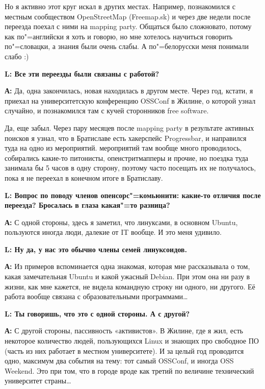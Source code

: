 \documentclass[10pt, a5paper]{article}
\begin{document}
Но я активно этот круг искал в других местах. Например, познакомился с местным сообществом OpenStreetMap (Freemap.sk) и через две недели после переезда поехал с ними на mapping party. Общаться было сложновато, потому как по"=английски я хоть и говорю, но мне хотелось научиться говорить по"=словацки, а знания были очень слабы. А по"=белорусски меня понимали слабо :)

{\noindent \bf L: Все эти переезды были связаны с работой?}

{\noindent \bf А:} Да, одна закончилась, новая находилась в другом месте. Через год, кстати, я приехал на университетскую конференцию OSSConf в Жилине, о которой узнал случайно, и познакомился там с кучей сторонников free software.

Да, еще забыл. Через пару месяцев после mapping party в результате активных поисков я узнал, что в Братиславе есть хакерспейс Progressbar, и направился туда на одно из мероприятий. мероприятий там вообще много проводилось, собирались какие-то питонисты, опенстритмапперы и прочие, но поездка туда занимала бы 5 часов в одну сторону, поэтому часто посещать их не получалось, пока я не переехал в конечном итоге в Братиславу.

{\noindent \bf L: Вопрос по поводу членов опенсорс"=комьюнити: какие-то отличия после переезда? Бросалась в глаза какая"=то разница?}

{\noindent \bf А:} С одной стороны, здесь я заметил, что линуксами, в основном Ubuntu, пользуются иногда люди, далекие от IT вообще. И это меня удивило.

{\noindent \bf L: Ну да, у нас это обычно члены семей линуксоидов.}

{\noindent \bf А:} Из примеров вспоминается одна знакомая, которая мне рассказывала о том, какая замечательная Ubuntu и какой ужасный Debian. При этом она ни разу в жизни, как мне кажется, не видела командную строку ни одного, ни другого. Её работа вообще связана с образовательными программами\ldots

{\noindent \bf L: Ты говоришь, что это с одной стороны. А с другой?}

{\noindent \bf А:} С другой стороны, пассивность «активистов». В Жилине, где я жил, есть некоторое количество людей, пользующихся Linux и знающих про свободное ПО (часть из них работает в местном университете). И за целый год проводится одно, максимум два события на тему: тот самый OSSConf, и иногда OSS Weekend. Это при том, что в городе вроде как третий по величине технический университет страны\ldots 
\end{document}
